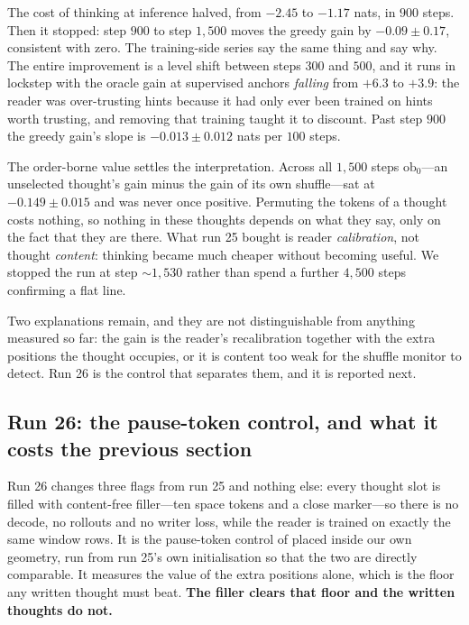 \documentclass{article} %
\begin{document}
The cost of thinking at inference halved, from $-2.45$ to $-1.17$ nats, in $900$ steps. Then it stopped: step $900$ to step $1{,}500$ moves the greedy gain by $-0.09 \pm 0.17$, consistent with zero. The training-side series say the same thing and say why. The entire improvement is a level shift between steps $300$ and $500$, and it runs in lockstep with the oracle gain at supervised anchors \emph{falling} from $+6.3$ to $+3.9$: the reader was over-trusting hints because it had only ever been trained on hints worth trusting, and removing that training taught it to discount. Past step $900$ the greedy gain's slope is $-0.013 \pm 0.012$ nats per $100$ steps.

The order-borne value settles the interpretation. Across all $1{,}500$ steps $\mathrm{ob}_0$---an unselected thought's gain minus the gain of its own shuffle---sat at $-0.149 \pm 0.015$ and was never once positive. Permuting the tokens of a thought costs nothing, so nothing in these thoughts depends on what they say, only on the fact that they are there. What run 25 bought is reader \emph{calibration}, not thought \emph{content}: thinking became much cheaper without becoming useful. We stopped the run at step ${\sim}1{,}530$ rather than spend a further $4{,}500$ steps confirming a flat line.

Two explanations remain, and they are not distinguishable from anything measured so far: the gain is the reader's recalibration together with the extra positions the thought occupies, or it is content too weak for the shuffle monitor to detect. Run 26 is the control that separates them, and it is reported next.

\subsection{Run 26: the pause-token control, and what it costs the previous section}
\label{sec:run26}

Run 26 changes three flags from run 25 and nothing else: every thought slot is filled with content-free filler---ten space tokens and a close marker---so there is no decode, no rollouts and no writer loss, while the reader is trained on exactly the same window rows. It is the pause-token control of \citet{goyal2024think} placed inside our own geometry, run from run 25's own initialisation so that the two are directly comparable. It measures the value of the extra positions alone, which is the floor any written thought must beat. \textbf{The filler clears that floor and the written thoughts do not.}
\end{document}
